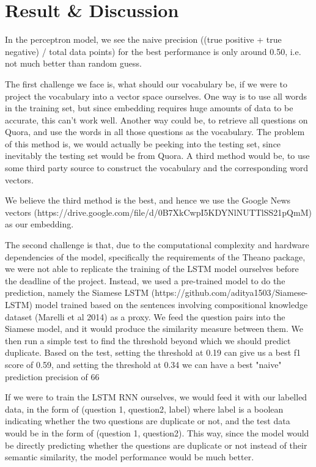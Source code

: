 \section{Result \& Discussion}
\justify
In the perceptron model, we see the naive precision ((true positive + true negative) / total data points) for the best performance is only around 0.50, i.e. not much better than random guess.

The first challenge we face is, what should our vocabulary be, if we were to project the vocabulary into a vector space ourselves. One way is to use all words in the training set, but since embedding requires huge amounts of data to be accurate, this can't work well. Another way could be, to retrieve all questions on Quora, and use the words in all those questions as the vocabulary. The problem of this method is, we would actually be peeking into the testing set, since inevitably the testing set would be from Quora. A third method would be, to use some third party source to construct the vocabulary and the corresponding word vectors.

We believe the third method is the best, and hence we use the Google News vectors (https://drive.google.com/file/d/0B7XkCwpI5KDYNlNUTTlSS21pQmM) as our embedding.

The second challenge is that, due to the computational complexity and hardware dependencies of the model, specifically the requirements of the Theano package, we were not able to replicate the training of the LSTM model ourselves before the deadline of the project. Instead, we used a pre-trained model to do the prediction, namely the Siamese LSTM (https://github.com/aditya1503/Siamese-LSTM) model trained based on the sentences involving compositional knowledge dataset (Marelli et al 2014) as a proxy. We feed the question pairs into the Siamese model, and it would produce the similarity measure between them. We then run a simple test to find the threshold beyond which we should predict duplicate. Based on the test, setting the threshold at 0.19 can give us a best f1 score of 0.59, and setting the threshold at 0.34 we can have a best "naive" prediction precision of 66%

If we were to train the LSTM RNN ourselves, we would feed it with our labelled data, in the form of (question 1, question2, label) where label is a boolean indicating whether the two questions are duplicate or not, and the test data would be in the form of (question 1, question2). This way, since the model would be directly predicting whether the questions are duplicate or not instead of their semantic similarity, the model performance would be much better.

